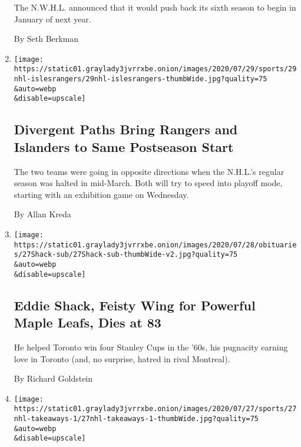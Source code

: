 \begin{enumerate}
  The N.W.H.L. announced that it would push back its sixth season to
  begin in January of next year.

  By Seth Berkman
\item
  \href{/2020/07/29/sports/hockey/new-york-rangers-islanders-playoffs.html}{}

  \texttt{[image: https://static01.graylady3jvrrxbe.onion/images/2020/07/29/sports/29nhl-islesrangers/29nhl-islesrangers-thumbWide.jpg?quality=75\\\&auto=webp\\\&disable=upscale]}

  \hypertarget{divergent-paths-bring-rangers-and-islanders-to-same-postseason-start}{%
  \subsection{Divergent Paths Bring Rangers and Islanders to Same
  Postseason
  Start}\label{divergent-paths-bring-rangers-and-islanders-to-same-postseason-start}}

  The two teams were going in opposite directions when the N.H.L.'s
  regular season was halted in mid-March. Both will try to speed into
  playoff mode, starting with an exhibition game on Wednesday.

  By Allan Kreda
\item
  \href{/2020/07/27/sports/hockey/eddie-shack-feisty-wing-for-powerful-maple-leafs-dies-at-83.html}{}

  \texttt{[image: https://static01.graylady3jvrrxbe.onion/images/2020/07/28/obituaries/27Shack-sub/27Shack-sub-thumbWide-v2.jpg?quality=75\\\&auto=webp\\\&disable=upscale]}

  \hypertarget{eddie-shack-feisty-wing-for-powerful-maple-leafs-dies-at-83}{%
  \subsection{Eddie Shack, Feisty Wing for Powerful Maple Leafs, Dies at
  83}\label{eddie-shack-feisty-wing-for-powerful-maple-leafs-dies-at-83}}

  He helped Toronto win four Stanley Cups in the '60s, his pugnacity
  earning love in Toronto (and, no surprise, hatred in rival Montreal).

  By Richard Goldstein
\item
  \href{/2020/07/27/sports/hockey/nhl-awards-restart-postseason.html}{}

  \texttt{[image: https://static01.graylady3jvrrxbe.onion/images/2020/07/27/sports/27nhl-takeaways-1/27nhl-takeaways-1-thumbWide.jpg?quality=75\\\&auto=webp\\\&disable=upscale]}


\end{enumerate}

